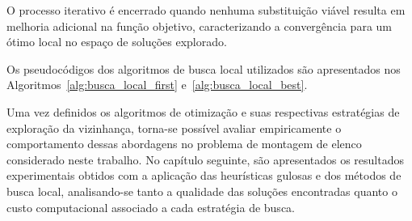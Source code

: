 O processo iterativo é encerrado quando nenhuma substituição viável resulta em melhoria adicional na função objetivo, caracterizando a 
convergência para um ótimo local no espaço de soluções explorado.

Os pseudocódigos dos algoritmos de busca local utilizados são apresentados nos Algoritmos~\ref{alg:busca_local_first} e~\ref{alg:busca_local_best}.



\FloatBarrier

Uma vez definidos os algoritmos de otimização e suas respectivas estratégias de exploração da vizinhança, torna-se possível avaliar empiricamente 
o comportamento dessas abordagens no problema de montagem de elenco considerado neste trabalho. No capítulo seguinte, são apresentados os resultados experimentais 
obtidos com a aplicação das heurísticas gulosas e dos métodos de busca local, analisando-se tanto a qualidade das soluções encontradas quanto o custo computacional 
associado a cada estratégia de busca.